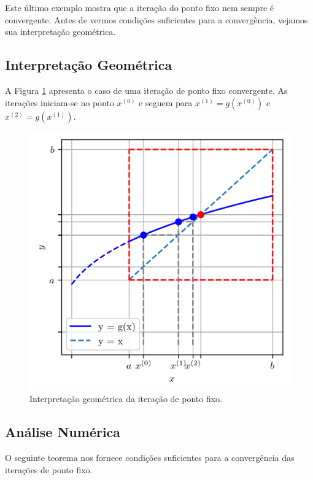 Este último exemplo mostra que a iteração do ponto fixo nem sempre é convergente. Antes de vermos condições suficientes para a convergência, vejamos sua interpretação geométrica.

\subsection{Interpretação Geométrica}

A Figura \ref{cap_eq1d_sec_pfixo:fig:pfixo_interp} apresenta o caso de uma iteração de ponto fixo convergente. As iterações iniciam-se no ponto $x^{(0)}$ e seguem para $x^{(1)} = g(x^{(0)})$ e $x^{(2)} = g(x^{(1)})$.

\begin{figure}[H]
  \centering
  \includegraphics[width=\textwidth]{./cap_eq1d/dados/fig_pfixo_interp/fig}
  \caption{Interpretação geométrica da iteração de ponto fixo.}
  \label{cap_eq1d_sec_pfixo:fig:pfixo_interp}
\end{figure}

\subsection{Análise Numérica}

O seguinte teorema nos fornece condições suficientes para a convergência das iterações de ponto fixo.

